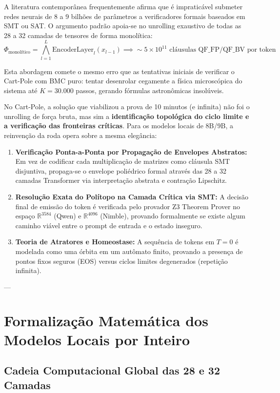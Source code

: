 \documentclass[11pt,a4paper]{article}
\theoremstyle{definition}
\begin{document}
A literatura contemporânea frequentemente afirma que é impraticável submeter redes neurais de 8 a 9 bilhões de parâmetros a verificadores formais baseados em SMT ou SAT. O argumento padrão apoia-se no unrolling exaustivo de todas as 28 a 32 camadas de tensores de forma monolítica:
\begin{equation}
    \Phi_{\text{monolítico}} = \bigwedge_{l=1}^{L} \text{EncoderLayer}_l(x_{l-1}) \implies \sim 5 \times 10^{11} \text{ cláusulas QF\_FP/QF\_BV por token}
\end{equation}

Esta abordagem comete o mesmo erro que as tentativas iniciais de verificar o Cart-Pole com BMC puro: tentar desenrolar cegamente a física microscópica do sistema até $K=30.000$ passos, gerando fórmulas astronômicas insolúveis.

No Cart-Pole, a solução que viabilizou a prova de 10 minutos (e infinita) não foi o unrolling de força bruta, mas sim a \textbf{identificação topológica do ciclo limite e a verificação das fronteiras críticas}. Para os modelos locais de 8B/9B, a reinvenção da roda opera sobre a mesma elegância:
\begin{enumerate}
    \item \textbf{Verificação Ponta-a-Ponta por Propagação de Envelopes Abstratos:} Em vez de codificar cada multiplicação de matrizes como cláusula SMT disjuntiva, propaga-se o envelope poliédrico formal através das 28 a 32 camadas Transformer via interpretação abstrata e contração Lipschitz.
    \item \textbf{Resolução Exata do Polítopo na Camada Crítica via SMT:} A decisão final de emissão do token é verificada pelo provador Z3 Theorem Prover no espaço $\mathbb{R}^{3584}$ (Qwen) e $\mathbb{R}^{4096}$ (Nimble), provando formalmente se existe algum caminho viável entre o prompt de entrada e o estado inseguro.
    \item \textbf{Teoria de Atratores e Homeostase:} A sequência de tokens em $T=0$ é modelada como uma órbita em um autômato finito, provando a presença de pontos fixos seguros (EOS) versus ciclos limites degenerados (repetição infinita).
\end{enumerate}

---

\section{Formalização Matemática dos Modelos Locais por Inteiro}

\subsection{Cadeia Computacional Global das 28 e 32 Camadas}
\end{document}
